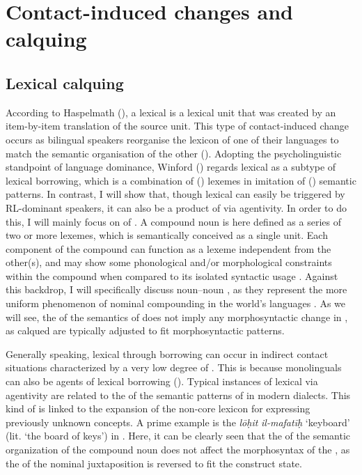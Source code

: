 \documentclass[output=paper]{langsci/langscibook}
\begin{document}
 \section{Contact-induced changes and calquing}


 \subsection{Lexical calquing}\label{sec:lex}

According to Haspelmath (\citeyear[39]{Haspelmath2009}), a lexical  is a lexical unit that was created by an item-by-item translation of the source unit. This type of contact-induced change occurs as bilingual speakers reorganise the lexicon of one of their languages to match the semantic organisation of the other (\citealt[132]{Ross2007}). Adopting the psycholinguistic standpoint of language dominance, Winford (\citeyear[345]{Winford2003}) regards lexical  as a subtype of lexical borrowing, which is a combination of  () lexemes in imitation of  () semantic patterns. In contrast, I will show that, though lexical  can easily be triggered by RL-dominant speakers, it can also be a product of  via  agentivity. In order to do this, I will mainly focus on  of . A compound noun is here defined as a series of two or more lexemes, which is semantically conceived as a single unit. Each component of the compound can function as a lexeme independent from the other(s), and may show some phonological and/or morphological constraints within the compound when compared to its isolated syntactic usage \citep{Bauer2001}. Against this backdrop, I will specifically discuss noun–noun , as they represent the more uniform phenomenon of nominal compounding in the world’s languages \cite{Pepperforthcoming}. As we will see, the  of the semantics of  does not imply any morphosyntactic change in , as calqued  are typically adjusted to fit  morphosyntactic patterns.  

Generally speaking, lexical  through borrowing can occur in indirect contact situations characterized by a very low degree of . This is because  monolinguals can also be agents of lexical borrowing (\citealt[10]{VanCoetsem1988}). Typical instances of lexical  via  agentivity are related to the  of the semantic patterns of   in modern  dialects. This kind of  is linked to the expansion of the non-core  lexicon for expressing previously unknown concepts. A prime example is the   \textit{lōḥit} \textit{il-mafatīḥ} `keyboard' (lit. ‘the board of keys’) in  \citep[9]{WilmsenWoidich2011}. Here, it can be clearly seen that the  of the semantic organization of the  compound noun does not affect the morphosyntax of the , as the  of the  nominal juxtaposition is reversed to fit the  construct state.  
\end{document}
